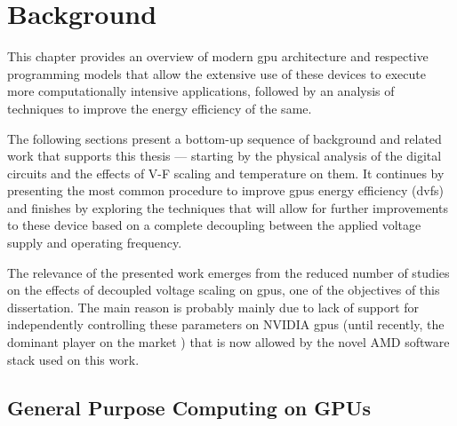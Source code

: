 
\chapter{Background}
\label{chapter:background}

This chapter provides an overview of modern \acrshort{gpu} architecture and respective programming models that allow the extensive use of these devices to execute more computationally intensive applications, followed by an analysis of techniques to improve the energy efficiency of the same. 

The following sections present a bottom-up sequence of background and related work that supports this thesis — starting by the physical analysis of the digital circuits and the effects of V-F scaling and temperature on them. It continues by presenting the most common procedure to improve \acrshort{gpu}s energy efficiency (\acrshort{dvfs}) and finishes by exploring the techniques that will allow for further improvements to these device based on a complete decoupling between the applied voltage supply and operating frequency. 

The relevance of the presented work emerges from the reduced number of studies on the effects of decoupled voltage scaling on \acrshort{gpu}s, one of the objectives of this dissertation. The main reason is probably mainly due to lack of support for independently controlling these parameters on NVIDIA \acrshort{gpu}s (until recently, the dominant player on the market \cite{noauthor_jon_2018, mujtaba_amd_2019}) that is now allowed by the novel AMD software stack used on this work.






\section{General Purpose Computing on GPUs}
\label{section:gpp_gpu}

